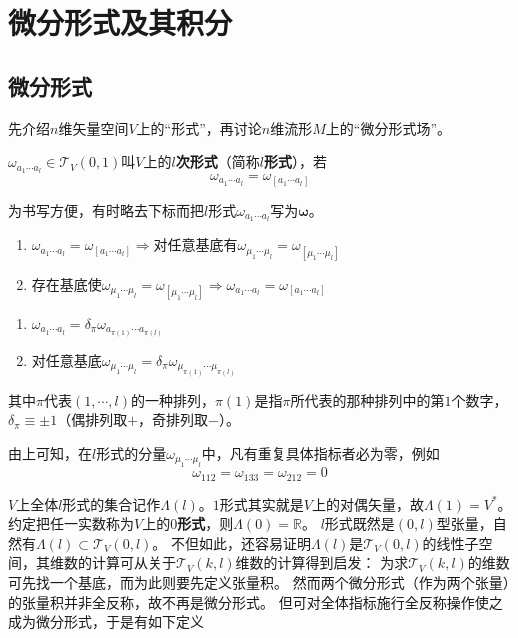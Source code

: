 \chapter{微分形式及其积分}

\section{微分形式}

先介绍$n$维矢量空间$V$上的``形式''，再讨论$n$维流形$M$上的``微分形式场''。

\begin{definition}
    $\omega_{a_1 \cdots a_l} \in \mathscr{T}_V(0, 1)$叫$V$上的\textbf{$l$次形式}（简称\textbf{$l$形式}），若
    $$\omega_{a_1 \cdots a_l} = \omega_{[a_1 \cdots a_l]}$$
\end{definition}

为书写方便，有时略去下标而把$l$形式$\omega_{a_1 \cdots a_l}$写为$\bm\omega$。

\begin{theorem}
    \begin{enumerate}[（a）]
        \item $\omega_{a_1 \cdots a_l} = \omega_{[a_1 \cdots a_l]} \Rightarrow \text{对任意基底有} \omega_{\mu_1 \cdots \mu_l} = \omega_{[\mu_1 \cdots \mu_l]}$
        \item $\text{存在基底使} \omega_{\mu_1 \cdots \mu_l} = \omega_{[\mu_1 \cdots \mu_l]} \Rightarrow \omega_{a_1 \cdots a_l} = \omega_{[a_1 \cdots a_l]}$
    \end{enumerate}
\end{theorem}

\begin{theorem}
    \begin{enumerate}[（a）]
        \item $\omega_{a_1 \cdots a_l} = \delta_\pi\omega_{a_{\pi(1)} \cdots a_{\pi(l)}}$
        \item $\text{对任意基底} \omega_{\mu_1 \cdots \mu_l} = \delta_\pi\omega_{\mu_{\pi(1)} \cdots \mu_{\pi(l)}}$
    \end{enumerate}
    其中$\pi$代表$(1, \cdots, l)$的一种排列，$\pi(1)$是指$\pi$所代表的那种排列中的第$1$个数字，$\delta_\pi \equiv \pm 1$（偶排列取$+$，奇排列取$-$）。
\end{theorem}

由上可知，在$l$形式的分量$\omega_{\mu_1 \cdots \mu_l}$中，凡有重复具体指标者必为零，例如
$$\omega_{112} = \omega_{133} = \omega_{212} = 0$$

$V$上全体$l$形式的集合记作$\Lambda(l)$。$1$形式其实就是$V$上的对偶矢量，故$\Lambda(1) = V^*$。
约定把任一实数称为$V$上的\textbf{$0$形式}，则$\Lambda(0) = \mathbb{R}$。
$l$形式既然是$(0, l)$型张量，自然有$\Lambda(l) \subset \mathscr{T}_V(0, l)$。
不但如此，还容易证明$\Lambda(l)$是$\mathscr{T}_V(0, l)$的线性子空间，其维数的计算可从关于$\mathscr{T}_V(k, l)$维数的计算得到启发：
为求$\mathscr{T}_V(k, l)$的维数可先找一个基底，而为此则要先定义张量积。
然而两个微分形式（作为两个张量）的张量积并非全反称，故不再是微分形式。
但可对全体指标施行全反称操作使之成为微分形式，于是有如下定义


